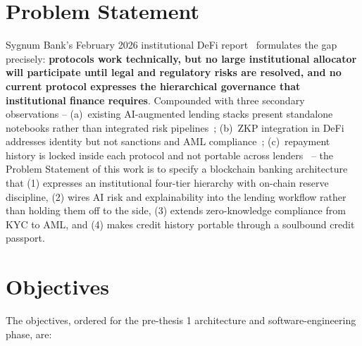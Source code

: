 \documentclass[12pt,a4paper]{report}
\begin{document}
\section{Problem Statement}
\label{sec:problem}

Sygnum Bank's February 2026 institutional DeFi report~\cite{sygnum2026defi} formulates the gap precisely: \textbf{protocols work technically, but no large institutional allocator will participate until legal and regulatory risks are resolved, and no current protocol expresses the hierarchical governance that institutional finance requires}. Compounded with three secondary observations -- (a)~existing AI-augmented lending stacks present standalone notebooks rather than integrated risk pipelines~\cite{palaiokrassas2023ml, xaiCreditRisk2024}; (b)~ZKP integration in DeFi addresses identity but not sanctions and AML compliance~\cite{piper2025zkkyc, zkAml2025}; (c)~repayment history is locked inside each protocol and not portable across lenders~\cite{buterin2022soulbound} -- the Problem Statement of this work is to specify a blockchain banking architecture that (1) expresses an institutional four-tier hierarchy with on-chain reserve discipline, (2) wires AI risk and explainability into the lending workflow rather than holding them off to the side, (3) extends zero-knowledge compliance from KYC to AML, and (4) makes credit history portable through a soulbound credit passport.

\section{Objectives}
\label{sec:objectives}

The objectives, ordered for the pre-thesis 1 architecture and software-engineering phase, are:
\end{document}
